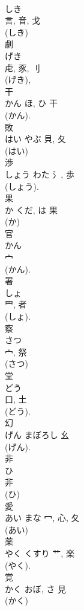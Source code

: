 \documentclass[8pt]{extreport}
\begin{document}
\begin{CJK}{UTF8}{min}
\\	しき	
\\	言, 音, 戈	
\\	(しき) 
\\	劇	
\\	げき	
\\	虍, 豕, 刂	
\\	(げき), 
\\	干	
\\	かん	ほ, ひ	干	
\\	(かん). 
\\	敗	
\\	はい	やぶ	貝, 夂	
\\	(はい) 
\\	渉	
\\	しょう	わた	氵, 歩	
\\	(しょう). 
\\	果	
\\	か	くだ, は	果	
\\	(か) 
\\	官	
\\	かん	
\\	宀		
\\	(かん). 
\\	署	
\\	しょ	
\\	罒, 者	
\\	(しょ). 
\\	察	
\\	さつ	
\\	宀, 祭	
\\	(さつ) 
\\	堂	
\\	どう	
\\	口, 土		
\\	(どう). 
\\	幻	
\\	げん	まぼろし	幺		
\\	(げん). 
\\	非	
\\	ひ	
\\	非	
\\	(ひ) 
\\	愛	
\\	あい	まな	冖, 心, 夂		
\\	(あい) 
\\	薬	
\\	やく	くすり	艹, 楽	
\\	(やく). 
\\	覚	
\\	かく	おぼ, さ	見		
\\	(かく) 

\end{CJK}
\end{document}
